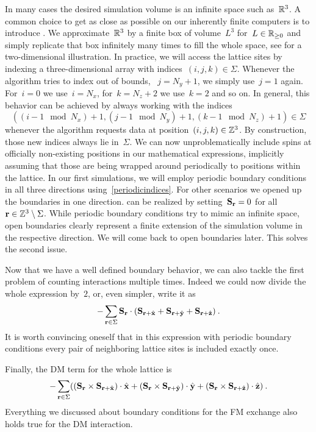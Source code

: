 In many cases the desired simulation volume is an infinite space such
as~$\mathbb{R}^3$. A common choice to get as close as possible on our inherently finite
computers is to introduce . We
approximate~$\mathbb{R}^3$ by a finite box of volume~$L^3$ for~$L\in \mathbb{R}_{\ge 0}$ and simply
replicate that box infinitely many times to fill the whole space, see
 for a two-dimensional illustration. In practice, we will
access the lattice sites by indexing a three-dimensional array with
indices~$(i,j,k)\in\Sigma$. Whenever the algorithm tries to index out of bounds,
\eg{}~$j=N_y + 1$, we simply use~$j=1$ again. For~$i=0$ we use~$i=N_x$,
for~$k=N_z+2$ we use~$k=2$ and so on. In general, this behavior can be achieved
by always working with the indices
%
\begin{equation}\label{periodicindices}
  ((i-1 \mod N_x) + 1, (j-1 \mod N_y) + 1, (k-1 \mod N_z) + 1) \in \Sigma
\end{equation}
%
whenever the algorithm requests data at position~$(i,j,k) \in \mathbb{Z}^3$. By
construction, those new indices always lie in~$\Sigma$. We can now
unproblematically include spins at officially non-existing positions in our
mathematical expressions, implicitly assuming that those are being wrapped
around periodically to positions within the lattice. In our first simulations,
we will employ periodic boundary conditions in all three directions
using~\eqref{periodicindices}. For other scenarios we opened up the boundaries
in one direction.  can be realized by setting~$\mathbf{S}_{\mathbf{r}} =
0$ for all~$\mathbf{r} \in \mathbb{Z}^3 \setminus \Sigma$. While periodic boundary conditions
try to mimic an infinite space, open boundaries clearly represent a finite
extension of the simulation volume in the respective direction. We will come
back to open boundaries later. This solves the second issue.

Now that we have a well defined boundary behavior, we can also tackle the first
problem of counting interactions multiple times. Indeed we could now divide the
whole expression by~$2$, or, even simpler, write it as
%
\begin{equation}\label{FMsum}
  -\sum_{\mathbf{r} \in \Sigma} \mathbf{S}_{\mathbf{r}} \cdot
    (\mathbf{S}_{\mathbf{r} + \hat{\mathbf{x}}} + \mathbf{S}_{\mathbf{r} + \hat{\mathbf{y}}} + \mathbf{S}_{\mathbf{r} + \hat{\mathbf{z}}})\:.
\end{equation}
%
It is worth convincing oneself that in this expression with periodic boundary
conditions every pair of neighboring lattice sites is included exactly once.

Finally, the DM term for the whole lattice is
%
\begin{equation}\label{DMsum}
  -\sum_{\mathbf{r} \in \Sigma} ((\mathbf{S}_{\mathbf{r}} \times \mathbf{S}_{\mathbf{r} + \hat{\mathbf{x}}}) \cdot \hat{\mathbf{x}} +
    (\mathbf{S}_{\mathbf{r}} \times \mathbf{S}_{\mathbf{r} + \hat{\mathbf{y}}}) \cdot \hat{\mathbf{y}} +
    (\mathbf{S}_{\mathbf{r}} \times \mathbf{S}_{\mathbf{r} + \hat{\mathbf{z}}}) \cdot \hat{\mathbf{z}})\:.
\end{equation}
%
Everything we discussed about boundary conditions for the FM exchange also holds
true for the DM interaction.


